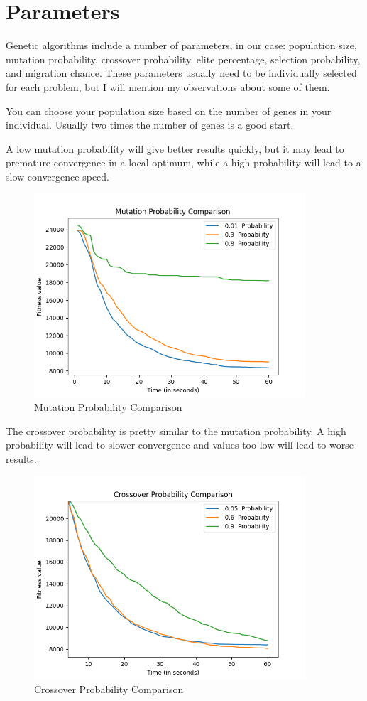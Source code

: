 \section{Parameters}
Genetic algorithms include a number of parameters, in our case: population size, mutation probability, crossover probability, elite percentage, selection probability, and migration chance. These parameters usually need to be individually selected for each problem, but I will mention my observations about some of them.
\par
You can choose your population size based on the number of genes in your individual. Usually two times the number of genes is a good start.
\par
A low mutation probability will give better results quickly, but it may lead to premature convergence in a local optimum, while a high probability will lead to a slow convergence speed.
\par
\begin{figure}[H]
\centering
\includegraphics[width=0.9\textwidth]{images/mutation.png}
\caption{Mutation Probability Comparison}
\end{figure}
The crossover probability is pretty similar to the mutation probability. A high probability will lead to slower convergence and values too low will lead to worse results.
\begin{figure}[H]
\centering
\includegraphics[width=0.9\textwidth]{images/crossover.png}
\caption{Crossover Probability Comparison}
\end{figure}
